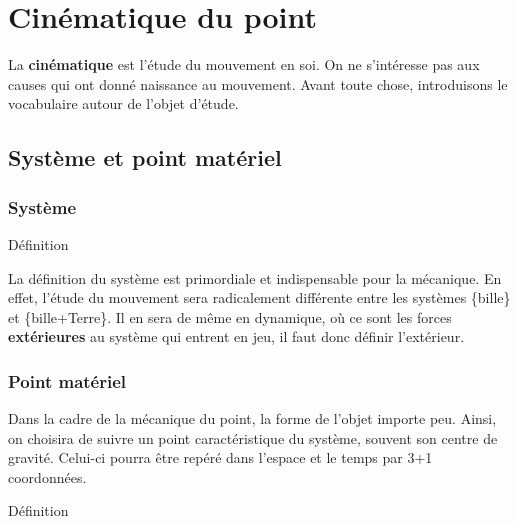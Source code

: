 \documentclass[../main/main.tex]{subfiles}
\begin{document}
\setcounter{chapter}{0}

\chapter{Cin\'ematique du point}

La \textbf{cinématique} est l'étude du mouvement en soi. On ne s'intéresse pas
aux causes qui ont donné naissance au mouvement. Avant toute chose, introduisons
le vocabulaire autour de l'objet d'étude.

\section{Système et point matériel}
\subsection{Système}
\begin{bdefi}{Définition}
    \vspace{-12pt}
\end{bdefi}

La définition du système est primordiale et indispensable pour la mécanique. En
effet, l'étude du mouvement sera radicalement différente entre les systèmes
\{bille\} et \{bille+Terre\}. Il en sera de même en dynamique, où ce sont les
forces \textbf{extérieures} au système qui entrent en jeu, il faut donc définir
l'extérieur.

\subsection{Point matériel}

Dans la cadre de la mécanique du point, la forme de l'objet importe peu. Ainsi,
on choisira de suivre un point caractéristique du système, souvent son centre de
gravité. Celui-ci pourra être repéré dans l'espace et le temps par 3+1
coordonnées.

\begin{bdefi}{Définition}
\end{bdefi}
\end{document}
